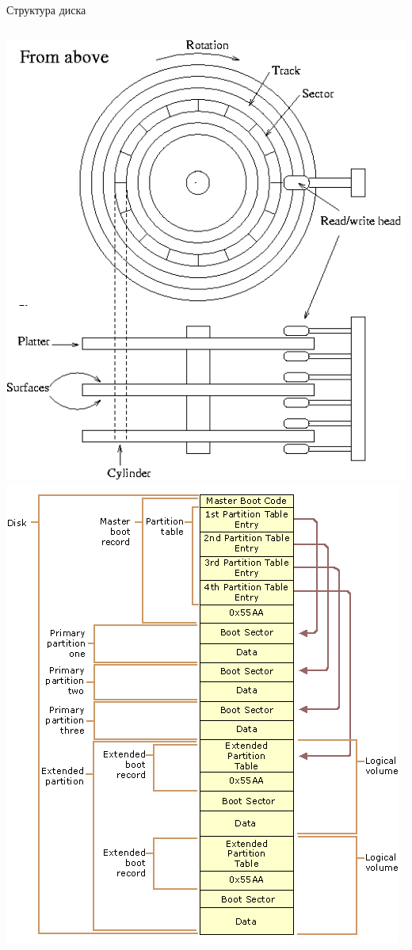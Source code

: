 \begin{frame}{Структура диска}
	\begin{columns}
		\includegraphics[height=0.8\textheight]{../../slides/disk/04-hd-schematic.png}
		\includegraphics[height=0.8\textheight]{../../slides/disk/04-disk-structure.png}
	\end{columns}
\end{frame}

